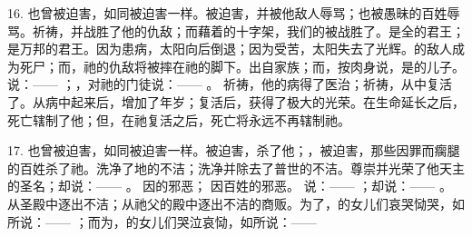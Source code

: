 16. 也曾被迫害，如同被迫害一样。被迫害，并被他敌人辱骂；也被愚昧的百姓辱骂。祈祷，并战胜了他的仇敌；而藉着的十字架，我们的被战胜了。是全的君王；是万邦的君王。因为患病，太阳向后倒退；因为受苦，太阳失去了光辉。的敌人成为死尸；而，祂的仇敌将被摔在祂的脚下。出自家族；而，按肉身说，是的儿子。说：—— ；，对祂的门徒说：—— 。 祈祷，他的病得了医治；祈祷，从中复活了。从病中起来后，增加了年岁；复活后，获得了极大的光荣。在生命延长之后，死亡辖制了他；但，在祂复活之后，死亡将永远不再辖制祂。\par

17. 也曾被迫害，如同被迫害一样。被迫害，杀了他；，被迫害，那些因罪而瘸腿的百姓杀了祂。洗净了地的不洁；洗净并除去了普世的不洁。尊崇并光荣了他天主的圣名；却说：—— 。 因的邪恶； 因百姓的邪恶。 说：—— ；却说：—— 。 从圣殿中逐出不洁；从祂父的殿中逐出不洁的商贩。为了，的女儿们哀哭恸哭，如所说：—— ；而为，的女儿们哭泣哀恸，如所说：—— \par

